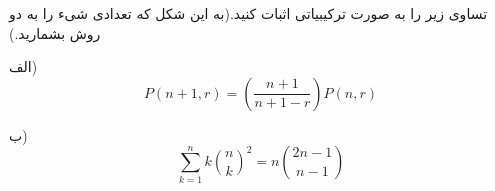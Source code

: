 \exercise
تساوی زیر را به صورت ترکیبیاتی اثبات کنید.(به این شکل که تعدادی شیء را به دو روش بشمارید.)

الف)
$$P(n+1, r) = (\frac{n+1}{n+1-r})P(n, r)$$

ب)
$$\sum_{k=1}^{n}k\binom n k ^2 = n\binom{2n-1}{n-1}$$